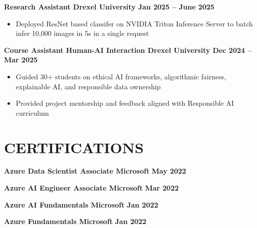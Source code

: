 \documentclass[10pt]{article}
\begin{document}
\noindent
\textbf{Research Assistant \textbar{} Drexel University \hfill Jan 2025 -- June 2025} \\
\vspace{-0.4cm}
\begin{itemize}[leftmargin=0.6cm, itemsep=-0.1cm, topsep=0cm]

    \item Deployed ResNet based classifer on NVIDIA Triton Inference Server to batch infer 10,000 images in 5s in a single request

\end{itemize}

\noindent
\textbf{Course Assistant \textbar{} Human-AI Interaction \textbar{} Drexel University  \hfill Dec 2024 -- Mar 2025} \\
\vspace{-0.4cm}
\begin{itemize}[leftmargin=0.6cm, itemsep=-0.1cm, topsep=0cm]

    \item Guided 30+ students on ethical AI frameworks, algorithmic fairness, explainable AI, and responsible data ownership

    \item Provided project mentorship and feedback aligned with Responsible AI curriculum

\end{itemize}



\vspace{-0.4cm} 
\section*{CERTIFICATIONS} 
\vspace{-0.2cm}

\noindent
\textbf{Azure Data Scientist Associate \textbar{} Microsoft } \hfill \textbf{May 2022 }

\noindent
\textbf{Azure AI Engineer Associate \textbar{} Microsoft } \hfill \textbf{Mar 2022 }

\noindent
\textbf{Azure AI Fundamentals \textbar{} Microsoft } \hfill \textbf{Jan 2022 }

\noindent
\textbf{Azure Fundamentals \textbar{} Microsoft } \hfill \textbf{Jan 2022 }
\end{document}
